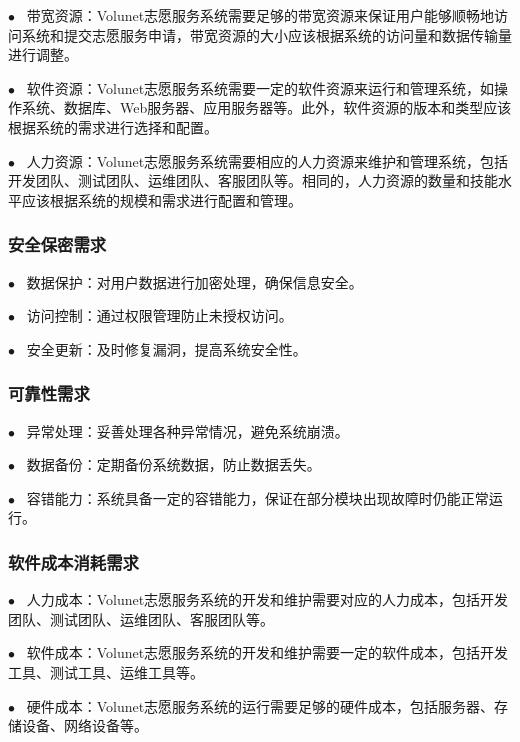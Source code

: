 $\bullet   \enspace$ 带宽资源：Volunet志愿服务系统需要足够的带宽资源来保证用户能够顺畅地访问系统和提交志愿服务申请，带宽资源的大小应该根据系统的访问量和数据传输量进行调整。
\hfill 

$\bullet   \enspace$ 软件资源：Volunet志愿服务系统需要一定的软件资源来运行和管理系统，如操作系统、数据库、Web服务器、应用服务器等。此外，软件资源的版本和类型应该根据系统的需求进行选择和配置。
\hfill 

$\bullet   \enspace$ 人力资源：Volunet志愿服务系统需要相应的人力资源来维护和管理系统，包括开发团队、测试团队、运维团队、客服团队等。相同的，人力资源的数量和技能水平应该根据系统的规模和需求进行配置和管理。
\hfill 

\subsubsection{安全保密需求}

$\bullet   \enspace$ 数据保护：对用户数据进行加密处理，确保信息安全。
\hfill 

$\bullet   \enspace$ 访问控制：通过权限管理防止未授权访问。
\hfill 

$\bullet   \enspace$ 安全更新：及时修复漏洞，提高系统安全性。
\hfill 



\subsubsection{可靠性需求}

$\bullet   \enspace$ 异常处理：妥善处理各种异常情况，避免系统崩溃。
\hfill 

$\bullet   \enspace$ 数据备份：定期备份系统数据，防止数据丢失。
\hfill 

$\bullet   \enspace$ 容错能力：系统具备一定的容错能力，保证在部分模块出现故障时仍能正常运行。
\hfill 



\subsubsection{软件成本消耗需求}
$\bullet   \enspace$ 人力成本：Volunet志愿服务系统的开发和维护需要对应的人力成本，包括开发团队、测试团队、运维团队、客服团队等。
\hfill 

$\bullet   \enspace$ 软件成本：Volunet志愿服务系统的开发和维护需要一定的软件成本，包括开发工具、测试工具、运维工具等。
\hfill 

$\bullet   \enspace$ 硬件成本：Volunet志愿服务系统的运行需要足够的硬件成本，包括服务器、存储设备、网络设备等。
\hfill 


